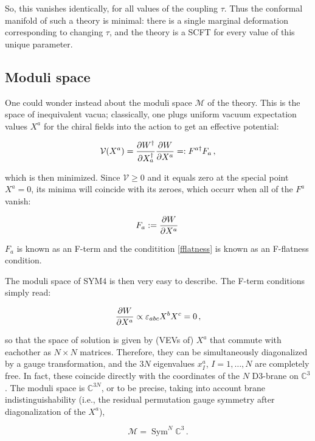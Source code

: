 So, this vanishes identically, for all values of the coupling $\tau$. Thus the conformal manifold of such a theory is minimal: there is a single marginal deformation corresponding to changing $\tau$, and the theory is a SCFT for every value of this unique parameter.

\subsection{Moduli space}

One could wonder instead about the moduli space $\mathcal{M}$ of the theory. This is the space of inequivalent vacua; classically, one plugs uniform vacuum expectation values $X^a$ for the chiral fields into the action to get an effective potential:

\begin{equation}
	\mathcal{V}(X^a) = \frac{\partial W^\dagger}{\partial X^\dagger_a} \frac{\partial W}{\partial X^a} =: F^{a\dagger} F_a\,,
	\label{}
\end{equation}

which is then minimized. Since $\mathcal{V} \geq 0$ and it equals zero at the special point $X^a = 0$, its minima will coincide with its zeroes, which occurr when all of the $F^a$ vanish:

\begin{equation}
	F_a := \frac{\partial W}{\partial X^a}\,
	\label{fflatness}
\end{equation}

$F_a$ is known as an F-term and the conditition \eqref{fflatness} is known as an F-flatness condition.

The moduli space of SYM4 is then very easy to describe. The F-term conditions simply read:

\begin{equation}
	\frac{\partial W}{\partial X^a} \propto \varepsilon_{abc} X^b X^c = 0\,,
	\label{}
\end{equation}

so that the space of solution is given by (VEVs of) $X^a$ that commute with eachother as $N\times N$ matrices. Therefore, they can be simultaneously diagonalized by a gauge transformation, and the $3N$ eigenvalues $x^a_I$, $I=1,\ldots,N$ are completely free. In fact, these coincide directly with the coordinates of the $N$ D3-brane on $\mathbb{C}^3$. The moduli space is $\mathbb{C}^{3N}$, or to be precise, taking into account brane indistinguishability (i.e., the residual permutation gauge symmetry after diagonalization of the $X^a$),

\begin{equation}
	\mathcal{M} = \operatorname{Sym}^N \mathbb{C}^3\,.
	\label{}
\end{equation}


